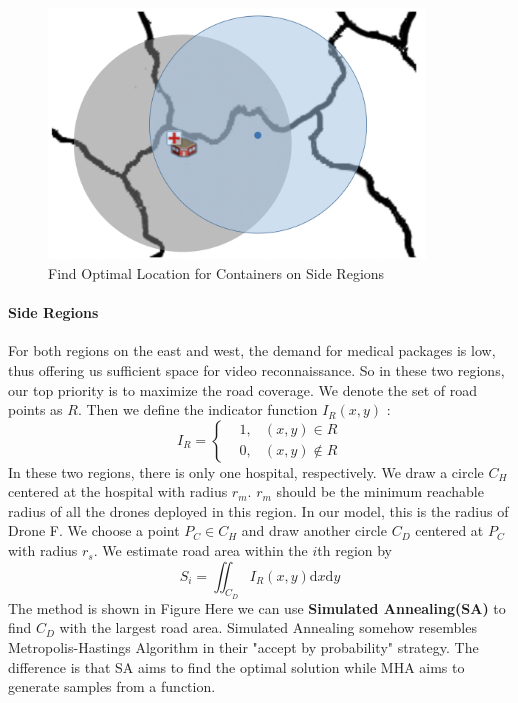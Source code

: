 \documentclass{mcmthesis}
\begin{document}
\begin{figure}
    \centering
    \includegraphics[width=10cm]{figures/find_location.png}
    \caption{Find Optimal Location for Containers on Side Regions}
    \label{Fig:fdlc}
\end{figure}

\paragraph{Side Regions} For both regions on the east and west, the demand for medical packages is low, thus offering us sufficient space for video reconnaissance. So in these two regions, our top priority is to maximize the road coverage. We denote the set of road points as $R$. Then we define the indicator function $I_R(x, y)$ \cite{ProbabilityTextbook}:
\begin{equation}
    I_R = \left\{
    \begin{aligned}
    &1, &(x, y)\in R \\
    &0, &(x, y)\notin R
    \end{aligned}
    \right.
    \label{Equ:indi}
\end{equation}
In these two regions, there is only one hospital, respectively. We draw a circle $C_H$ centered at the hospital with radius $r_m$. $r_m$ should be the minimum reachable radius of all the drones deployed in this region. In our model, this is the radius of Drone F. We choose a point $P_C\in C_H$ and draw another circle $C_D$ centered at $P_C$ with radius $r_s$. We estimate road area within the $i$th region by
\begin{equation}
    S_i = \iint_{C_D} I_R(x, y) \mathrm{d}x\mathrm{d}y
\end{equation}
The method is shown in Figure Here we can use \textbf{Simulated Annealing(SA)} to find $C_D$ with the largest road area. Simulated Annealing somehow resembles Metropolis-Hastings Algorithm in their "accept by probability" strategy. The difference is that SA aims to find the optimal solution while MHA aims to generate samples from a function. 
\end{document}
